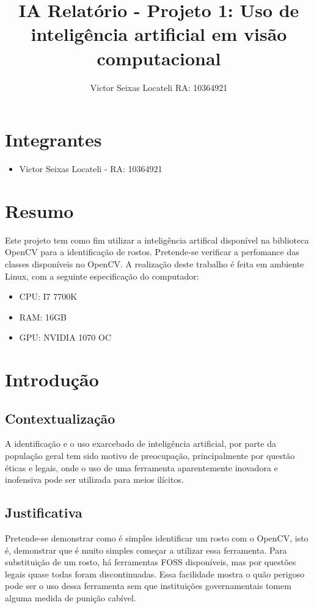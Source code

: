 \documentclass{article}
\title{IA Relatório - Projeto 1: Uso de inteligência artificial em visão computacional}
\author{Victor Seixas Locateli RA: 10364921}
\begin{document}
\maketitle
\newpage
\section{
Integrantes
}
\begin{itemize}
    \item Victor Seixas Locateli - RA: 10364921
\end{itemize}
    
\section{
Resumo
}

Este projeto tem como fim utilizar a inteligência artifical disponível na biblioteca OpenCV para a identificação de rostos. Pretende-se verificar a perfomance das classes disponíveis no OpenCV. A realização deste trabalho é feita em ambiente Linux, com a seguinte especificação do computador:
\begin{itemize}
    \item CPU: I7 7700K
    \item RAM: 16GB 
    \item GPU: NVIDIA 1070 OC
\end{itemize}
\section{Introdução}
\subsection{
Contextualização
}

A identificação e o uso exarcebado de inteligência artificial, por parte da população geral tem sido motivo de preocupação, principalmente por questão éticas e legais, onde o uso de uma ferramenta aparentemente inovadora e inofensiva pode ser utilizada para meios ilícitos.
\subsection{Justificativa}
Pretende-se demonstrar como é simples identificar um rosto com o OpenCV, isto é, demonstrar que é muito simples começar a utilizar essa ferramenta. Para substituição de um rosto, há ferramentas FOSS disponíveis, mas por questões legais quase todas foram discontinuadas. Essa facilidade mostra o quão perigoso pode ser o uso dessa ferramenta sem que instituições governamentais tomem alguma medida de punição cabível.
\end{document}
